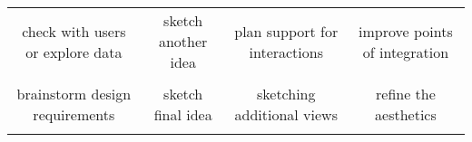 {\begin{longtable}[]{cccc}
\begin{minipage}[t]{0.21\columnwidth}
check with users or explore data\strut
\end{minipage} & \begin{minipage}[t]{0.21\columnwidth}\raggedright\strut
sketch another idea\strut
\end{minipage} & \begin{minipage}[t]{0.21\columnwidth}\raggedright\strut
plan support for interactions\strut
\end{minipage} & \begin{minipage}[t]{0.21\columnwidth}\raggedright\strut
improve points of integration\strut
\end{minipage}\tabularnewline
\begin{minipage}[t]{0.24\columnwidth}\raggedright\strut
\strut
\end{minipage} & \begin{minipage}[t]{0.24\columnwidth}\raggedright\strut
\strut
\end{minipage} & \begin{minipage}[t]{0.24\columnwidth}\raggedright\strut
\strut
\end{minipage} & \begin{minipage}[t]{0.24\columnwidth}\raggedright\strut
\strut
\end{minipage}\tabularnewline
\begin{minipage}[t]{0.21\columnwidth}\raggedright\strut
brainstorm design requirements\strut
\end{minipage} & \begin{minipage}[t]{0.21\columnwidth}\raggedright\strut
sketch final idea\strut
\end{minipage} & \begin{minipage}[t]{0.21\columnwidth}\raggedright\strut
sketching additional views\strut
\end{minipage} & \begin{minipage}[t]{0.21\columnwidth}\raggedright\strut
refine the aesthetics\strut
\end{minipage}\tabularnewline
\begin{minipage}[t]{0.24\columnwidth}\raggedright\strut
\strut
\end{minipage} & \begin{minipage}[t]{0.24\columnwidth}\raggedright\strut
\strut
\end{minipage} & \begin{minipage}[t]{0.24\columnwidth}\raggedright\strut
\strut
\end{minipage} & \begin{minipage}[t]{0.24\columnwidth}\raggedright\strut

\end{minipage}
\end{longtable}}
